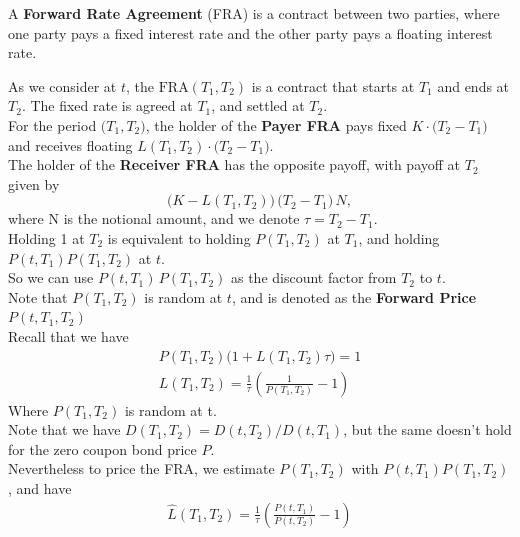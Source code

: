     A \textbf{Forward Rate Agreement} (FRA) is a contract between two parties, where one party pays a fixed interest rate and the other party pays a floating interest rate.
    
    As we consider at \(t\), the \(\mathrm{FRA}(T_1, T_2)\) is a contract that starts at \(T_1\) and ends at \(T_2\). The fixed rate is agreed at \(T_1\), and settled at \(T_2\). \\
    For the period \(\bigl(T_1, T_2\bigr)\), the holder of the \textbf{Payer FRA} pays fixed \(K \cdot \bigl(T_2 - T_1\bigr)\) and receives floating \(L(T_1, T_2) \cdot \bigl(T_2 - T_1\bigr)\). \\
    The holder of the \textbf{Receiver FRA} has the opposite payoff, with payoff at \(T_2\) given by
    \[
       \bigl(K - L(T_1, T_2)\bigr)\,\bigl(T_2 - T_1\bigr)\,N,
    \]
    where N is the notional amount, and we denote \(\tau = T_2 - T_1\).\\
    Holding 1 at \(T_2\) is equivalent to holding \(P(T_1, T_2)\) at \(T_1\), 
    and holding \(P(t, T_1) P(T_1, T_2)\) at \(t\).\\
    So we can use \(P(t, T_1)\,P(T_1, T_2)\) as the discount factor from \(T_2\) to \(t\).\\
    Note that \(P(T_1, T_2)\) is random at \(t\), and is denoted as 
    the \textbf{Forward Price} \(P(t, T_1, T_2)\) \\
    Recall that we have
    \begin{align*}
        P(T_1, T_2) \bigg( 1 + L(T_1, T_2) \tau  \bigg) = 1 \\
        L(T_1, T_2) = \frac{1}{\tau} \left( \frac{1}{P(T_1, T_2)} - 1 \right) 
    \end{align*}
    Where $P(T_1, T_2)$ is random at t.\\
    Note that we have $D(T_1, T_2) = D(t, T_2) / D(t, T_1)$, but the same doesn't
    hold for the zero coupon bond price $P$. \\
    Nevertheless to price the FRA, we estimate $P(T_1, T_2)$ with $P(t, T_1) P(T_1, T_2)$,
    and have
    \begin{align*}
        \hat{L}(T_1, T_2)
        = \frac{1}{\tau} \left( \frac{P(t, T_1)}{P(t, T_2)} - 1 \right) 
    \end{align*}
